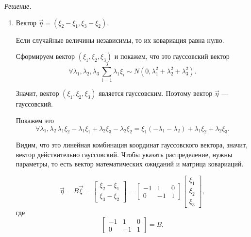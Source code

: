 \textit{Решение.}
\begin{enumerate}[label=\alph*)]
  \item Вектор $ \vec{ \eta } = \left( \xi_2 - \xi_1, \xi_3 - \xi_2 \right) $.

  Если случайные величины независимы, то их ковариация равна нулю.

  Сформируем вектор $ \left( \xi_1, \xi_2, \xi_3 \right) $ и покажем, что это гауссовский вектор
  $$ \forall \lambda_1, \lambda_2, \lambda_3 \,
    \sum \limits_{i = 1}^3 \lambda_1 \xi_i \sim
    N \left( 0, \lambda_1^2 + \lambda_2^2 + \lambda_3^2 \right).$$

  Значит, вектор $ \left( \xi_1, \xi_2, \xi_3 \right) $ является гауссовским.
  Поэтому вектор $ \vec{ \eta } $ --- гауссовский.

  Покажем это
  $$ \forall \lambda_1, \lambda_2 \,
    \lambda_1 \xi_2 - \lambda_1 \xi_1 + \lambda_2 \xi_3 - \lambda_2 \xi_2 =
    \xi_1 \left( - \lambda_1 - \lambda_2 \right) + \lambda_1 \xi_2 + \lambda_2 \xi_3.$$

  Видим, что это линейная комбинация координат гауссовского вектора, значит,
  вектор действительно гауссовский.
  Чтобы указать распределение, нужны параметры,
  то есть вектор математических ожиданий и матрица ковариаций.

  $$ \vec{ \eta } =
    B \vec{ \xi } =
    \begin{bmatrix}
      \xi_2 - \xi_1 \\
      \xi_3 - \xi_2
    \end{bmatrix} =
    \begin{bmatrix}
      -1 & 1 & 0 \\
      0 & -1 & 1
    \end{bmatrix}
    \begin{bmatrix}
      \xi_1 \\
      \xi_2 \\
      \xi_3
    \end{bmatrix},$$
  где
  $$ \begin{bmatrix}
      -1 & 1 & 0 \\
      0 & -1 & 1
    \end{bmatrix} =
    B.$$


\end{enumerate}
